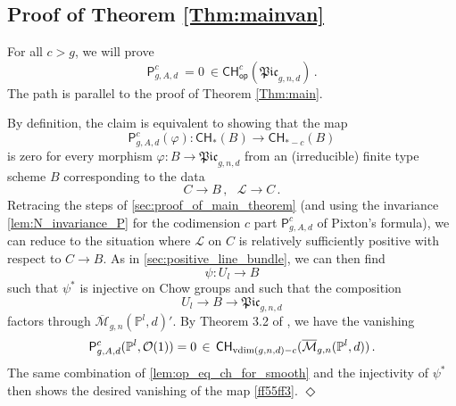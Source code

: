 \documentclass[a4paper,12pt]{article} %
\newcommand{\ca}[1]{{\mathcal{#1}}}
\def\P{\mathsf{P}}
\def\PP{\mathbb{P}}
\def\qed{{\hfill $\Diamond$}}
\theoremstyle{definition}
\theoremstyle{plain}%
\renewcommand{\phi}{\varphi}
\newcommand{\Picabs}{\mathfrak{Pic}}
\newcommand{\Chow}{\mathsf{CH}}
\begin{document}
\subsection{Proof of Theorem \ref{Thm:mainvan}}
For all $c>g$, we will prove 
\begin{equation} \label{eqn:PgAdc_vanishing}
    \P_{g,A,d}^c\ = 0 \
\in {\mathsf{CH}}^c_{\mathsf{op}}(\Picabs_{g,n,d})\, .
\end{equation}
The path is parallel to the proof of Theorem \ref{Thm:main}.

By definition, the claim is
equivalent to showing that the map 
\begin{equation}\label{ff55ff3}
 \P_{g,A,d}^c(\phi) : \Chow_*(B) \to \Chow_{*-c}(B)
 \end{equation}
is zero for every
morphism $\phi:B \to \Picabs_{g,n,d}$ from an (irreducible) finite type scheme $B$ 
corresponding to the data
$$C \to B\, , \ \ \  \ca L \to C\,.$$
Retracing the steps of \cref{sec:proof_of_main_theorem} (and using the invariance \cref{lem:N_invariance_P}  for the codimension $c$ part $\P_{g,A,d}^c$ of Pixton's formula), we can reduce to the situation where $\ca L$ on $C$ is relatively sufficiently
positive with respect to $C \to B$. As in \cref{sec:positive_line_bundle},
we can then find $$\psi: U_l \to B$$
such that $\psi^*$ is injective on Chow groups and such that the composition 
$$U_l \to B \to \Picabs_{g,n,d}$$ 
factors through $\overline{\mathcal{M}}_{g,n}(\PP^l, d)'$. By Theorem 3.2
of \cite{Bae}, 
we have the vanishing $$\P_{g,A,d}^c (\PP^l,\ca O(1)) = 0
\, \in \, \mathsf{CH}_{\textup{vdim}(g,n,d)-c}(\overline{\mathcal{M}}_{g,n}(\PP^l, d))\, .$$
The same combination of \cref{lem:op_eq_ch_for_smooth} and the injectivity of $\psi^*$ then shows the desired vanishing of the map \eqref{ff55ff3}. \qed


\end{document}
